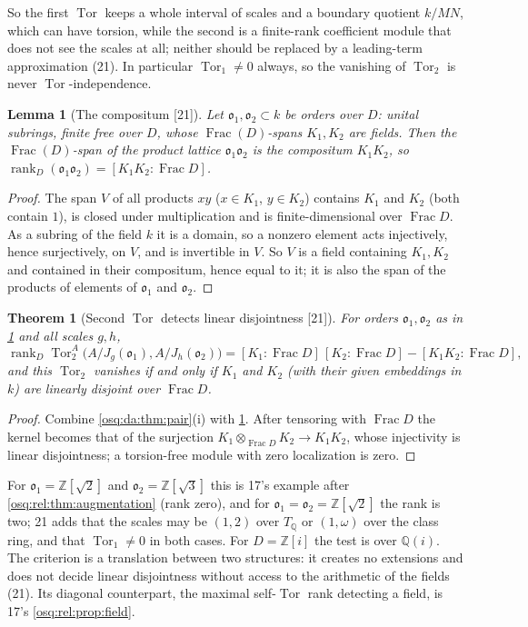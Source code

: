\documentclass[11pt,letterpaper]{article}
\numberwithin{equation}{section}
\newtheorem{theorem}{Theorem}[section]
\newtheorem{lemma}[lemma]{Lemma}
\theoremstyle{definition}
\theoremstyle{remark}
\theoremstyle{plain}
\newcommand{\Z}{\mathbb Z}
\newcommand{\Q}{\mathbb Q}
\newcommand{\Frac}{\operatorname{Frac}}
\newcommand{\Tor}{\operatorname{Tor}}
\newcommand{\rk}{\operatorname{rank}}
\newcommand{\src}[1]{\textup{\textsf{[#1]}}}
\begin{document}
So the first $\Tor$ keeps a whole interval of scales and a boundary quotient $k/MN$, which can have torsion, while the second is a
finite-rank coefficient module that does not see the scales at all; neither should be replaced by a leading-term approximation (21). In
particular $\Tor_1\ne0$ always, so the vanishing of $\Tor_2$ is never $\Tor$-independence.

\begin{lemma}[The compositum \src{21}]\label{osq:da:lem:compositum}
Let $\mathfrak o_1,\mathfrak o_2\subset k$ be orders over $D$: unital subrings, finite free over $D$, whose $\Frac(D)$-spans $K_1,K_2$ are fields.
Then the $\Frac(D)$-span of the product lattice $\mathfrak o_1\mathfrak o_2$ is the compositum $K_1K_2$, so $\rk_D(\mathfrak o_1\mathfrak o_2)=[K_1K_2:\Frac D]$.
\end{lemma}
\begin{proof}
The span $V$ of all products $xy$ ($x\in K_1$, $y\in K_2$) contains $K_1$ and $K_2$ (both contain $1$), is closed under multiplication and is
finite-dimensional over $\Frac D$. As a subring of the field $k$ it is a domain, so a nonzero element acts injectively, hence surjectively, on
$V$, and is invertible in $V$. So $V$ is a field containing $K_1,K_2$ and contained in their compositum, hence equal to it; it is also the
span of the products of elements of $\mathfrak o_1$ and $\mathfrak o_2$.
\end{proof}

\begin{theorem}[Second $\Tor$ detects linear disjointness \src{21}]\label{osq:da:thm:disjoint}
For orders $\mathfrak o_1,\mathfrak o_2$ as in \cref{osq:da:lem:compositum} and all scales $g,h$,
\[
 \rk_D\Tor^A_2\bigl(A/J_g(\mathfrak o_1),A/J_h(\mathfrak o_2)\bigr)=[K_1:\Frac D]\,[K_2:\Frac D]-[K_1K_2:\Frac D],
\]
and this $\Tor_2$ vanishes if and only if $K_1$ and $K_2$ (with their given embeddings in $k$) are linearly disjoint over $\Frac D$.
\end{theorem}
\begin{proof}
Combine \cref{osq:da:thm:pair}(i) with \cref{osq:da:lem:compositum}. After tensoring with $\Frac D$ the kernel becomes that of the surjection
$K_1\otimes_{\Frac D}K_2\to K_1K_2$, whose injectivity is linear disjointness; a torsion-free module with zero localization is zero.
\end{proof}

For $\mathfrak o_1=\Z[\sqrt2]$ and $\mathfrak o_2=\Z[\sqrt3]$ this is 17's example after \cref{osq:rel:thm:augmentation} (rank zero), and for
$\mathfrak o_1=\mathfrak o_2=\Z[\sqrt2]$ the rank is two; 21 adds that the scales may be $(1,2)$ over $T_\Q$ or $(1,\omega)$ over the class
ring, and that $\Tor_1\ne0$ in both cases. For $D=\Z[i]$ the test is over $\Q(i)$. The criterion is a translation between two structures: it
creates no extensions and does not decide linear disjointness without access to the arithmetic of the fields (21). Its diagonal
counterpart, the maximal self-$\Tor$ rank detecting a field, is 17's \cref{osq:rel:prop:field}.
\end{document}
